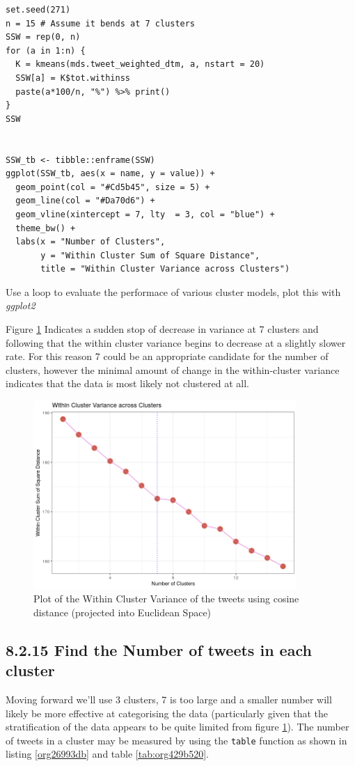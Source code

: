 \documentclass[11pt]{article}
\begin{document}
\begin{listing}[htbp]
\begin{verbatim}
set.seed(271)
n = 15 # Assume it bends at 7 clusters
SSW = rep(0, n)
for (a in 1:n) {
  K = kmeans(mds.tweet_weighted_dtm, a, nstart = 20)
  SSW[a] = K$tot.withinss
  paste(a*100/n, "%") %>% print()
}
SSW


SSW_tb <- tibble::enframe(SSW)
ggplot(SSW_tb, aes(x = name, y = value)) +
  geom_point(col = "#Cd5b45", size = 5) +
  geom_line(col = "#Da70d6") +
  geom_vline(xintercept = 7, lty  = 3, col = "blue") +
  theme_bw() +
  labs(x = "Number of Clusters",
       y = "Within Cluster Sum of Square Distance",
       title = "Within Cluster Variance across Clusters")
\end{verbatim}
\caption{\label{orge6531f1}Use a loop to evaluate the performace of various cluster models, plot this with \emph{ggplot2}}
\end{listing}

Figure \ref{fig:orga698b06} Indicates a sudden stop of decrease in variance at 7 clusters and following that the within cluster variance begins to decrease at a slightly slower rate. For this reason 7 could be an appropriate candidate for the number of clusters, however the minimal amount of change in the within-cluster variance indicates that the data is most likely not clustered at all.


\begin{figure}[htbp]
\centering
\includegraphics[width=10cm]{./Figures/Q14WithinClusterVariance.png}
\caption{\label{fig:orga698b06}Plot of the Within Cluster Variance of the tweets using cosine distance (projected into Euclidean Space)}
\end{figure}

\subsection{8.2.15 Find the Number of tweets in each cluster}
\label{sec:orgda0fb09}
Moving forward we'll use 3 clusters, 7 is too large and a smaller number will likely be more effective at categorising the data (particularly given that the stratification of the data appears to be quite limited from figure \ref{fig:orga698b06}). The number of tweets in a cluster may be measured by using the \texttt{table} function as shown in listing \ref{org26993db} and table \ref{tab:org429b520}.
\end{document}
